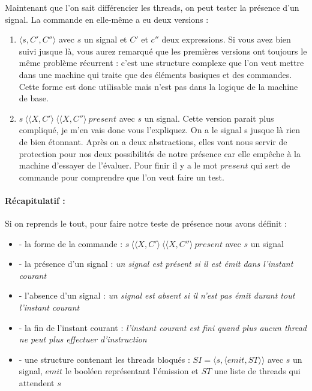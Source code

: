 \documentclass[10pt,a4paper]{article}
\begin{document}
				Maintenant que l'on sait différencier les threads, on peut tester la présence d'un signal. La commande en elle-même a eu deux versions :
				\begin{enumerate}
					\item $\langle s,C',C''\rangle$ avec $s$ un signal et $C'$ et $c''$ deux expressions. Si vous avez bien suivi jusque là, vous aurez remarqué que les premières versions ont toujours le même problème récurrent : c'est une structure complexe que l'on veut mettre dans une machine qui traite que des éléments basiques et des commandes. Cette forme est donc utilisable mais n'est pas dans la logique de la machine de base.
					\item $s~\langle\langle X,C'\rangle~\langle\langle X,C''\rangle~present$ avec $s$ un signal. Cette version parait plus compliqué, je m'en vais donc vous l'expliquez. On a le signal s jusque là rien de bien étonnant. Après on a deux abstractions, elles vont nous servir de protection pour nos deux possibilités de notre présence car elle empêche à la machine d'essayer de l'évaluer. Pour finir il y a le mot $present$ qui sert de commande pour comprendre que l'on veut faire un test.
				\end{enumerate} 
				\bigbreak
					
					
				\paragraph{Récapitulatif :} Si on reprends le tout, pour faire notre teste de présence nous avons définit :
				\begin{itemize}
					\item[] - la forme de la commande : $s~\langle\langle X,C'\rangle~\langle\langle X,C''\rangle~present$ avec $s$ un signal
					\item[] - la présence d'un signal : \textit{un signal est présent si il est émit dans l'instant courant}
					\item[] - l'absence d'un signal : \textit{un signal est absent si il n'est pas émit durant tout l'instant courant}
					\item[] - la fin de l'instant courant : \textit{l'instant courant est fini quand plus aucun thread ne peut plus effectuer d'instruction}
					\item[] - une structure contenant les threads bloqués : $SI = \langle s , \langle emit , ST \rangle\rangle$ avec $s$ un signal, $emit$ le booléen représentant l'émission et $ST$ une liste de threads qui attendent $s$
				\end{itemize}
				\bigbreak
				\bigbreak
					
\end{document}
